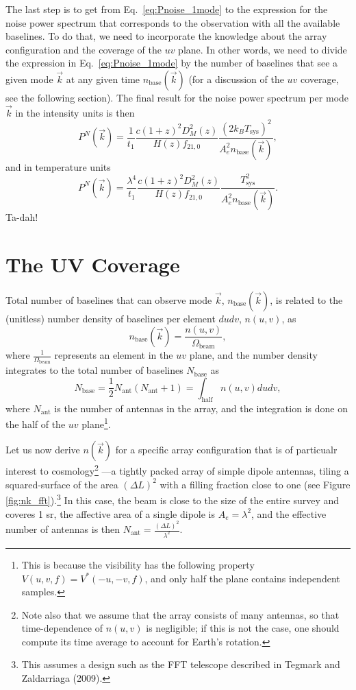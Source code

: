 \documentclass[12pt]{paper}
\newcommand{\beq}{\begin{equation}}
\newcommand{\eeq}{\end{equation}}
\begin{document}
The last step is to get from Eq.~\ref{eq:Pnoise_1mode} to the expression for the noise power spectrum that corresponds to the observation with all the available baselines. To do that, we need to incorporate the knowledge about the array configuration and the coverage of the $uv$ plane. In other words, we need to divide the expression in Eq.~\ref{eq:Pnoise_1mode} by the number of baselines that see a given mode $\vec k$ at any given time $n_\text{base}(\vec k)$ (for a discussion of the $uv$ coverage, see the following section). The final result for the noise power spectrum per mode $\vec k$ in the intensity units is then
\beq
P^N(\vec k) = \frac{1}{t_\text{1}}\frac{c(1+z)^2D_M^2(z)}{H(z)f_{21,0}}\frac{\left(2k_BT_\text{sys}\right)^2}{A_e^2n_\text{base}(\vec k)},
\label{eq:Pnoise_Jy}
\eeq
and in temperature units
\beq
P^N(\vec k) = \frac{\lambda^4}{t_\text{1}}\frac{c(1+z)^2D_M^2(z)}{H(z)f_{21,0}}\frac{T_\text{sys}^2}{A_e^2n_\text{base}(\vec k)}.
\label{eq:Pnoise_K}
\eeq
Ta-dah!
\section{The UV Coverage}
\label{sec:uv_coverage}

Total number of baselines that can observe mode $\vec k$, $n_\text{base}(\vec k)$, is related to the (unitless) number density of baselines per element $dudv$, $n(u,v)$, as
\beq
n_\text{base}(\vec k) = \frac{n(u,v)}{\Omega_\text{beam}},
\label{eq:nuv_nk}
\eeq
where $\frac{1}{\Omega_\text{beam}}$ represents an element in the $uv$ plane, and the number density integrates to the total number of baselines $N_\text{base}$ as 
\beq
N_\text{base}=\frac{1}{2}N_\text{ant}(N_\text{ant}+1) = \int_\text{half} n(u,v)dudv,
\label{eq:nk}
\eeq
where $N_\text{ant}$ is the number of antennas in the array, and the integration is done on the half of the $uv$ plane\footnote{This is because the visibility has the following property $V(u,v,f)=V^*(-u,-v,f)$, and only half the plane contains independent samples.}.

Let us now derive $n(\vec k)$ for a specific array configuration that is of particualr interest to cosmology\footnote{Note also that we assume that the array consists of many antennas, so that time-dependence of $n(u,v)$ is negligible; if this is not the case, one should compute its time average to account for Earth's rotation.} ---a tightly packed array of simple dipole antennas, tiling a squared-surface of the area $(\Delta L)^2$ with a filling fraction close to one (see Figure \ref{fig:nk_fft}).\footnote{This assumes a design such as the FFT telescope described in Tegmark and Zaldarriaga (2009).} In this case, the beam is close to the size of the entire survey and coveres 1 sr, the affective area of a single dipole is $A_e = \lambda^2$, and the effective number of antennas is then $N_\text{ant} = \frac{(\Delta L)^2}{\lambda^2}$.
\end{document}
